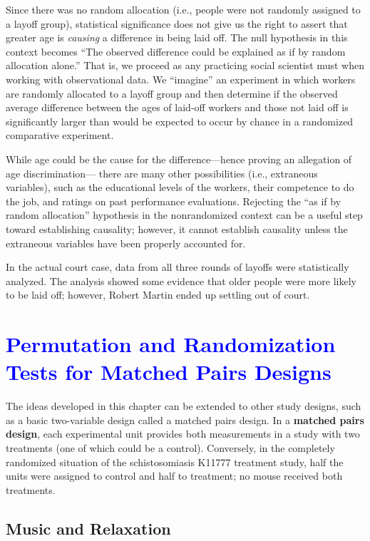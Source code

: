 \documentclass[
]{report}
\begin{document}
Since there was no random allocation (i.e., people were not randomly assigned to a layoff group), statistical significance does not give us the right to assert that greater age is \emph{causing} a difference in being laid off. The null hypothesis in this context becomes ``The observed difference could be explained as if by random allocation alone.'' That is, we proceed as any practicing social scientist must when working with observational data. We ``imagine'' an experiment in which workers are randomly allocated to a layoff group and then determine if the observed average difference between the ages of laid-off workers and those not laid off is significantly larger than would be expected to occur by chance in a randomized comparative experiment.

While age could be the cause for the difference---hence proving an allegation of age discrimination--- there are many other possibilities (i.e., extraneous variables), such as the educational levels of the workers, their competence to do the job, and ratings on past performance evaluations. Rejecting the ``as if by random allocation'' hypothesis in the nonrandomized context can be a useful step toward establishing causality; however, it cannot establish causality unless the extraneous variables have been properly accounted for.

In the actual court case, data from all three rounds of layoffs were statistically analyzed. The analysis showed some evidence that older people were more likely to be laid off; however, Robert Martin ended up settling out of court.

\hypertarget{section-6}{%
\section{\texorpdfstring{\textcolor{blue}{Permutation and Randomization Tests for Matched Pairs Designs}}{}}\label{section-6}}

The ideas developed in this chapter can be extended to other study designs, such as a basic two-variable design called a matched pairs design. In a \textbf{matched pairs design}, each experimental unit provides both measurements in a study with two treatments (one of which could be a control). Conversely, in the completely randomized situation of the schistosomiasis K11777 treatment study, half the units were assigned to control and half to treatment; no mouse received both treatments.

\hypertarget{music-and-relaxation}{%
\subsection*{Music and Relaxation}\label{music-and-relaxation}}
\end{document}
